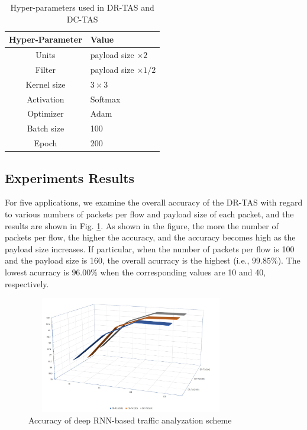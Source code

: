 \documentclass[10pt, twoside, jounal]{IEEEtran}
\begin{document}
\begin{table}[t]
\caption{Hyper-parameters used in DR-TAS and DC-TAS}
\centering
\begin{tabular}{|c|l|}
\hline Hyper-Parameter & Value \\
\hline
\hline Units & payload size $\times 2$ \\
\hline Filter & payload size $\times 1/2$ \\
\hline Kernel size & $3 \times 3$ \\
\hline Activation & Softmax \\
\hline Optimizer & Adam \\
\hline Batch size & 100 \\
\hline Epoch & 200 \\
\hline
\end{tabular}
\label{table3}
\end{table}

\subsection{Experiments Results}
For five applications, we examine the overall accuracy of the DR-TAS with regard to various numbers of packets per flow and payload size of each packet, and the results are shown in Fig. \ref{fig3}.
As shown in the figure, the more the number of packets per flow, the higher the accuracy, and the accuracy becomes high as the payload size increases.
If particular, when the number of packets per flow is 100 and the payload size is 160, the overall
acurracy is the highest (i.e., $99.85\%$). The lowest acurracy is $96.00\%$ when the corresponding values are 10 and 40, respectively.
\begin{figure}[!t]
\centering
\setlength{\abovecaptionskip}{0pt}
\setlength{\belowcaptionskip}{0pt}
{
\includegraphics[width=3.6in, height=2.0in]{fig3.jpg}
\caption{Accuracy of deep RNN-based traffic analyzation scheme}
\label{fig3}
}
\end{figure}
\end{document}
